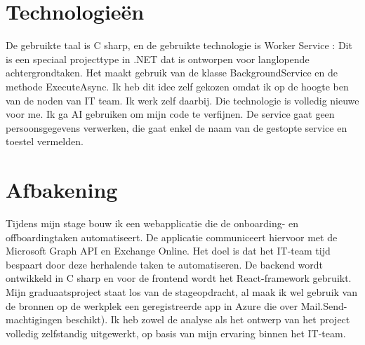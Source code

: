 
\section{Technologieën}%
\label{vst:technologieen}

%
%

De gebruikte taal is C sharp, en de gebruikte technologie is Worker Service : Dit is een speciaal projecttype in .NET dat is ontworpen voor langlopende achtergrondtaken. Het maakt gebruik van de klasse BackgroundService en de methode ExecuteAsync. Ik heb dit idee zelf gekozen omdat ik op de hoogte ben van de noden van IT team. Ik werk zelf daarbij. Die technologie is volledig nieuwe voor me. 
Ik ga AI gebruiken om mijn code te verfijnen.
De service gaat geen persoonsgegevens verwerken, die gaat enkel de naam van de gestopte service en toestel vermelden.   


\section{Afbakening}%
\label{vst:afbakening}

%
%

Tijdens mijn stage bouw ik een webapplicatie die de onboarding- en offboardingtaken automatiseert. De applicatie communiceert hiervoor met de Microsoft Graph API en Exchange Online. Het doel is dat het IT-team tijd bespaart door deze herhalende taken te automatiseren. De backend wordt ontwikkeld in C sharp en voor de frontend wordt het React-framework gebruikt. Mijn graduaatsproject staat los van de stageopdracht, al maak ik wel gebruik van de bronnen op de werkplek een geregistreerde app in Azure die over Mail.Send-machtigingen beschikt).
Ik heb zowel de analyse als het ontwerp van het project volledig zelfstandig uitgewerkt, op basis van mijn ervaring binnen het IT-team.


